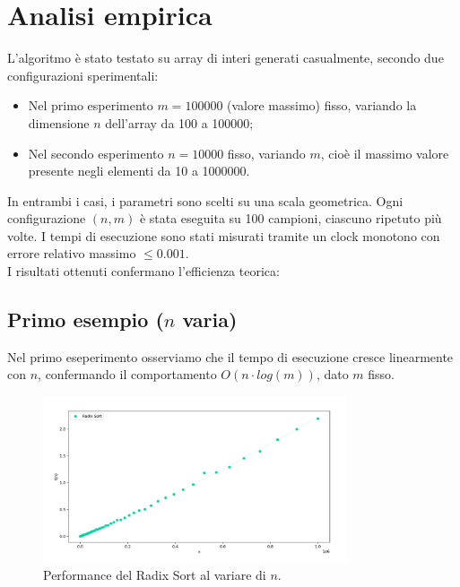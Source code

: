 \documentclass[a4paper, 12pt, oneside]{book}
\begin{document}
\section{Analisi empirica}

L'algoritmo è stato testato su array di interi generati casualmente, secondo due configurazioni sperimentali:

\begin{itemize}
    \item Nel primo esperimento \(m = 100000\) (valore massimo) fisso, variando la dimensione \(n\) dell'array da 100 a 100000;
    \item Nel secondo esperimento \(n = 10000\) fisso, variando \(m\), cioè il massimo valore presente negli elementi da 10 a 1000000.
\end{itemize}

\noindent In entrambi i casi, i parametri sono scelti su una scala geometrica. Ogni configurazione \((n, m)\) è stata eseguita su 100 campioni, ciascuno ripetuto più volte. I tempi di esecuzione sono stati misurati tramite un clock monotono con errore relativo massimo \(\leq 0.001\). \\

\noindent I risultati ottenuti confermano l'efficienza teorica:


\subsection{Primo esempio ($n$ varia)}

Nel primo eseperimento osserviamo che il tempo di esecuzione cresce linearmente con \(n\), confermando il comportamento \(O(n \cdot log(m))\), dato \(m\) fisso.

\begin{figure}[H]
    \centering
    \includegraphics[width=0.8\textwidth]{images/grafico_radix_sort_n.png}
    \caption{Performance del Radix Sort al variare di \(n\).}
    \label{fig:radix_sort_way_n}
\end{figure}
\end{document}
